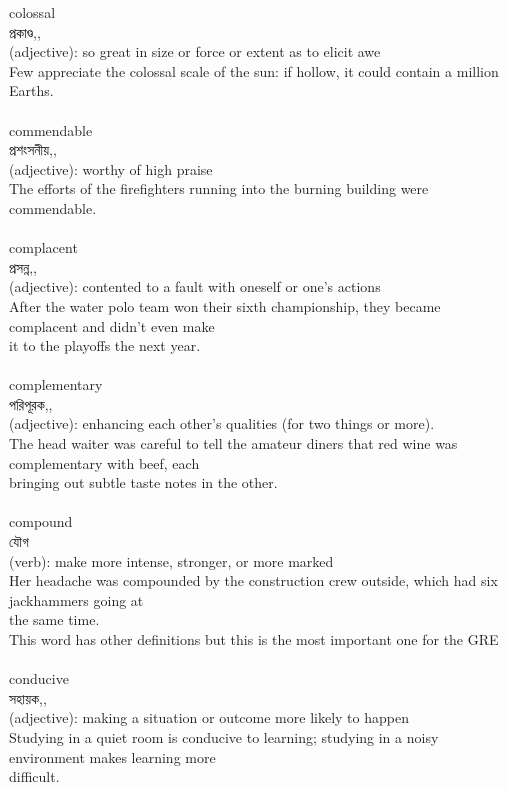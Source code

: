 \documentclass{article}
\begin{document}
{colossal}\\
{প্রকাণ্ড,,}\\
{(adjective): so great in size or force or extent as to elicit awe\\Few appreciate the colossal scale of the sun: if hollow, it could contain a million Earths.\\}\\
{commendable}\\
{প্রশংসনীয়,,}\\
{(adjective): worthy of high praise\\The efforts of the firefighters running into the burning building were commendable.\\}\\
{complacent}\\
{প্রসন্ন,,}\\
{(adjective): contented to a fault with oneself or one's actions\\After the water polo team won their sixth championship, they became complacent and didn't even make\\it to the playoffs the next year.\\}\\
{complementary}\\
{পরিপূরক,,}\\
{(adjective): enhancing each other's qualities (for two things or more).\\The head waiter was careful to tell the amateur diners that red wine was complementary with beef, each\\bringing out subtle taste notes in the other.\\}\\
{compound}\\
{যৌগ}\\
{(verb): make more intense, stronger, or more marked\\Her headache was compounded by the construction crew outside, which had six jackhammers going at\\the same time.\\This word has other definitions but this is the most important one for the GRE\\}\\
{conducive}\\
{সহায়ক,,}\\
{(adjective): making a situation or outcome more likely to happen\\Studying in a quiet room is conducive to learning; studying in a noisy environment makes learning more\\difficult.\\}\\
\end{document}
